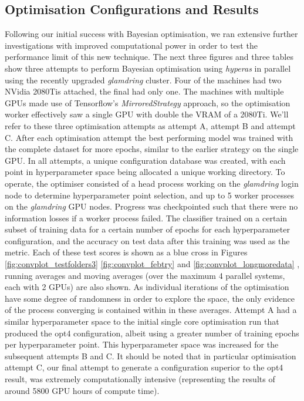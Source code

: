 \subsection{Optimisation Configurations and Results}
Following our initial success with Bayesian optimisation, we ran extensive further investigations with improved computational power in order to test the performance limit of this new technique. The next three figures and three tables show three attempts to perform Bayesian optimisation using \textit{hyperas} in parallel using the recently upgraded \textit{glamdring} cluster. Four of the machines had two NVidia 2080Tis attached, the final had only one. The machines with multiple GPUs made use of Tensorflow's \textit{MirroredStrategy} approach, so the optimisation worker effectively saw a single GPU with double the VRAM of a 2080Ti. We'll refer to these three optimisation attempts as attempt A, attempt B and attempt C. After each optimisation attempt the best performing model was trained with the complete dataset for more epochs, similar to the earlier strategy on the single GPU. In all attempts, a unique configuration database was created, with each point in hyperparameter space being allocated a unique working directory. To operate, the optimiser consisted of a head process working on the \textit{glamdring} login node to determine hyperparameter point selection, and up to 5 worker processes on the \textit{glamdring} GPU nodes. Progress was checkpointed such that there were no information losses if a worker process failed. The classifier trained on a certain subset of training data for a certain number of epochs for each hyperparameter configuration, and the accuracy on test data after this training was used as the metric. Each of these test scores is shown as a blue cross in Figures \ref{fig:convplot_testfolders3} \ref{fig:convplot_febtry} and \ref{fig:convplot_longmoredata} , running averages and moving averages (over the maximum 4 parallel systems, each with 2 GPUs) are also shown. As individual iterations of the optimisation have some degree of randomness in order to explore the space, the only evidence of the process converging is contained within in these averages. Attempt A had a similar hyperparameter space to the initial single core optimisation run that produced the opt4 configuration, albeit using a greater number of training epochs per hyperparameter point. This hyperparameter space was increased for the subsequent attempts B and C. It should be noted that in particular optimisation attempt C, our final attempt to generate a configuration superior to the opt4 result, was extremely computationally intensive (representing the results of around 5800 GPU hours of compute time).

